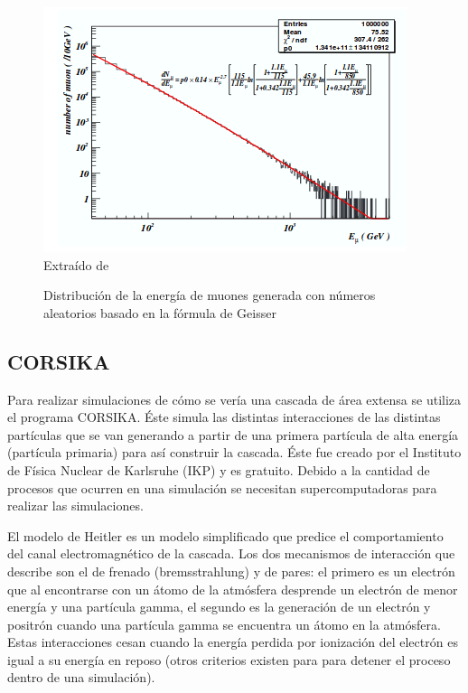 \documentclass{book}
\begin{document}
\begin{figure}[ht] %
\begin{center}
 \includegraphics[]{GeisserMuon.png}
 Extra\'ido de \citep{GUAN}
\caption{Distribuci\'on de la energ\'ia de muones generada con n\'umeros aleatorios basado en la f\'ormula de Geisser}
\end{center}
\end{figure}

\subsection{CORSIKA}
Para realizar simulaciones de cómo se vería una cascada de área extensa se utiliza el programa CORSIKA. Éste simula las distintas interacciones de las distintas partículas que se van generando a partir de una primera partícula de alta energía (partícula primaria) para así construir la cascada. Éste fue creado por el Instituto de Física Nuclear de Karlsruhe (IKP) y es gratuito. Debido a la cantidad de procesos que ocurren en una simulación se necesitan supercomputadoras para realizar las simulaciones. \citep{HECK}

El modelo de Heitler es un modelo simplificado que predice el comportamiento del canal electromagnético de la cascada. Los dos mecanismos de interacción que describe son el de frenado (bremsstrahlung) y de pares: el primero es un electrón que al encontrarse con un átomo de la atmósfera desprende un electrón de menor energía y una partícula gamma, el segundo es la generación de un electrón y positrón cuando una partícula gamma se encuentra un átomo en la atmósfera. Estas interacciones cesan cuando la energía perdida por ionización del electrón es igual a su energía en reposo (otros criterios existen para para detener el proceso dentro de una simulación). \citep{SUAREZ}
\end{document}
